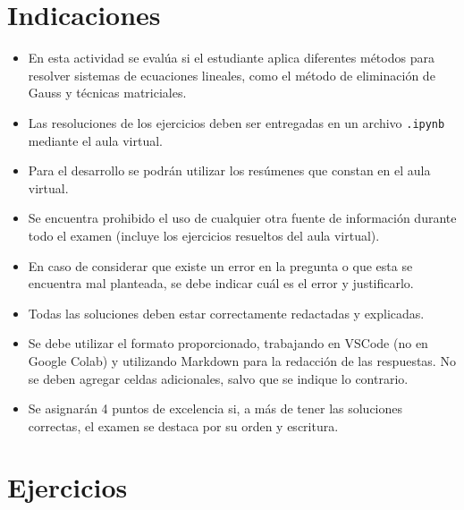 \documentclass[12pt,a4]{aleph-examen}
\begin{document}
\encabezado

\section*{Indicaciones}
\begin{itemize}[leftmargin=*]
\item 
    En esta actividad se evalúa si el estudiante aplica diferentes métodos para resolver sistemas de ecuaciones lineales, como el método de eliminación de Gauss y técnicas matriciales.
\item 
    Las resoluciones de los ejercicios deben ser entregadas en un archivo \texttt{.ipynb} mediante el aula virtual.
\item
    Para el desarrollo se podrán utilizar los resúmenes que constan en el aula virtual.
\item
    Se encuentra prohibido el uso de cualquier otra fuente de información durante todo el examen (incluye los ejercicios resueltos del aula virtual).
\item
    En caso de considerar que existe un error en la pregunta o que esta se encuentra mal planteada, se debe indicar cuál es el error y justificarlo.
\item
    Todas las soluciones deben estar correctamente redactadas y explicadas.
\item 
    Se debe utilizar el formato proporcionado, trabajando en VSCode (no en Google Colab) y utilizando Markdown para la redacción de las respuestas. No se deben agregar celdas adicionales, salvo que se indique lo contrario.
\item 
    Se asignarán 4 puntos de excelencia si, a más de tener las soluciones correctas, el examen se destaca por su orden y escritura.
\end{itemize}

\section*{Ejercicios}
\end{document}
